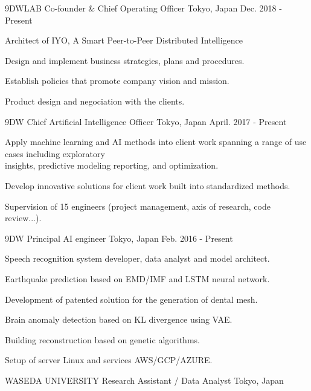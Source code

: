 \begin{cventries}
  \cventry
    {9DWLAB}
    {Co-founder \& Chief Operating Officer}
    {Tokyo, Japan}
    {Dec. 2018 - Present}
    {
      \begin{cvitems}
        \item {Architect of IYO, A Smart Peer-to-Peer Distributed Intelligence}
        \item {Design and implement business strategies, plans and procedures.}
        \item {Establish policies that promote company vision and mission.}
        \item {Product design and negociation with the clients.}
      \end{cvitems}
    }
    \cventry
    {9DW}
    {Chief Artificial Intelligence Officer}
    {Tokyo, Japan}
    {April. 2017 - Present}
    {
      \begin{cvitems}
        \item {Apply machine learning and AI methods into client work spanning a range of use cases including exploratory\\
         insights, predictive modeling reporting, and optimization.}
        \item {Develop innovative solutions for client work built into standardized methods.}
        \item {Supervision of 15 engineers (project management, axis of research, code review...).}
      \end{cvitems}
    }
    \cventry
    {9DW}
    {Principal AI engineer}
    {Tokyo, Japan}
    {Feb. 2016 - Present}
    {
      \begin{cvitems}
        \item {Speech recognition system developer, data analyst and model architect.}
        \item {Earthquake prediction based on EMD/IMF and LSTM neural network.}
        \item {Development of patented solution for the generation of dental mesh.}
        \item {Brain anomaly detection based on KL divergence using VAE.}
        \item {Building reconstruction based on genetic algorithms.}
        \item {Setup of server Linux and services AWS/GCP/AZURE.}
      \end{cvitems}
    }
  \cventry
    {WASEDA UNIVERSITY}
    {Research Assistant / Data Analyst}
    {Tokyo, Japan}

\end{cventries}
